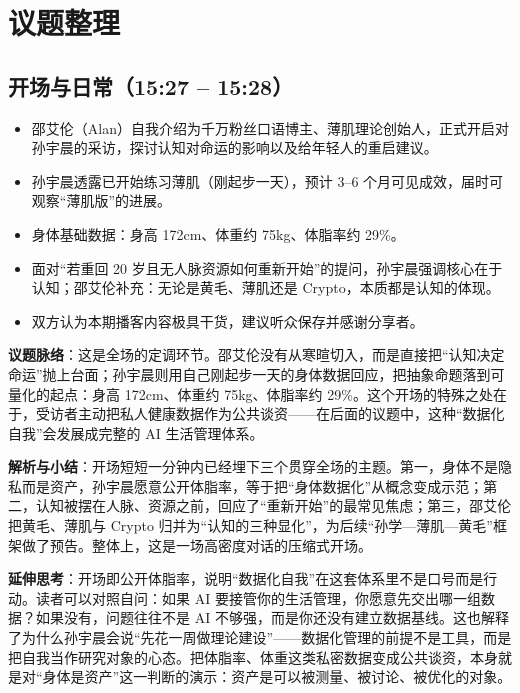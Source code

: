 \chapter{议题整理}

\section{开场与日常（15:27 --
15:28）}

\begin{itemize}
\tightlist
\item
  邵艾伦（Alan）自我介绍为千万粉丝口语博主、薄肌理论创始人，正式开启对孙宇晨的采访，探讨认知对命运的影响以及给年轻人的重启建议。
\item
  孙宇晨透露已开始练习薄肌（刚起步一天），预计 3--6
  个月可见成效，届时可观察``薄肌版''的进展。
\item
  身体基础数据：身高 172cm、体重约 75kg、体脂率约 29\%。
\item
  面对``若重回 20
  岁且无人脉资源如何重新开始''的提问，孙宇晨强调核心在于认知；邵艾伦补充：无论是黄毛、薄肌还是
  Crypto，本质都是认知的体现。
\item
  双方认为本期播客内容极具干货，建议听众保存并感谢分享者。
\end{itemize}

\textbf{议题脉络}：这是全场的定调环节。邵艾伦没有从寒暄切入，而是直接把``认知决定命运''抛上台面；孙宇晨则用自己刚起步一天的身体数据回应，把抽象命题落到可量化的起点：身高
172cm、体重约 75kg、体脂率约
29\%。这个开场的特殊之处在于，受访者主动把私人健康数据作为公共谈资------在后面的议题中，这种``数据化自我''会发展成完整的
AI 生活管理体系。

\textbf{解析与小结}：开场短短一分钟内已经埋下三个贯穿全场的主题。第一，身体不是隐私而是资产，孙宇晨愿意公开体脂率，等于把``身体数据化''从概念变成示范；第二，认知被摆在人脉、资源之前，回应了``重新开始''的最常见焦虑；第三，邵艾伦把黄毛、薄肌与
Crypto
归并为``认知的三种显化''，为后续``孙学---薄肌---黄毛''框架做了预告。整体上，这是一场高密度对话的压缩式开场。

\textbf{延伸思考}：开场即公开体脂率，说明``数据化自我''在这套体系里不是口号而是行动。读者可以对照自问：如果
AI 要接管你的生活管理，你愿意先交出哪一组数据？如果没有，问题往往不是 AI
不够强，而是你还没有建立数据基线。这也解释了为什么孙宇晨会说``先花一周做理论建设''------数据化管理的前提不是工具，而是把自我当作研究对象的心态。把体脂率、体重这类私密数据变成公共谈资，本身就是对``身体是资产''这一判断的演示：资产是可以被测量、被讨论、被优化的对象。

